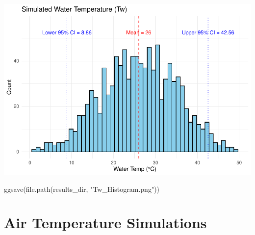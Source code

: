\documentclass[
]{article}
\newenvironment{Shaded}{\begin{snugshade}}{\end{snugshade}}
\newcommand{\FunctionTok}[1]{\textcolor[rgb]{0.00,0.00,0.00}{#1}}
\newcommand{\NormalTok}[1]{#1}
\newcommand{\StringTok}[1]{\textcolor[rgb]{0.31,0.60,0.02}{#1}}
\begin{document}
\includegraphics{V1075_MonteCarlo_Report_files/figure-latex/unnamed-chunk-4-1.pdf}

\begin{Shaded}
\begin{Highlighting}[]
\FunctionTok{ggsave}\NormalTok{(}\FunctionTok{file.path}\NormalTok{(results\_dir, }\StringTok{"Tw\_Histogram.png"}\NormalTok{))}
\end{Highlighting}
\end{Shaded}

\hypertarget{air_temperature_simulations}{%
\section{Air Temperature
Simulations}\label{air_temperature_simulations}}
\end{document}
